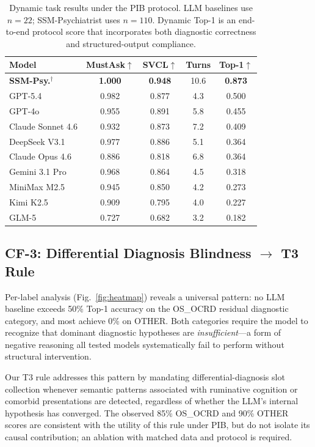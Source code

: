 \documentclass[conference]{IEEEtran}
\begin{document}
\begin{table}[htbp]
\caption{Dynamic task results under the PIB protocol. LLM baselines use $n=22$; SSM-Psychiatrist uses $n=110$. Dynamic Top-1 is an end-to-end protocol score that incorporates both diagnostic correctness and structured-output compliance.}
\label{tab:dynamic}
\begin{center}
\begin{tabular}{lcccc}
\toprule
\textbf{Model} & \textbf{MustAsk$\uparrow$} & \textbf{SVCL$\uparrow$} & \textbf{Turns} & \textbf{Top-1$\uparrow$} \\
\midrule
\rowcolor[gray]{0.88}
\textbf{SSM-Psy.}$^\dagger$ & \textbf{1.000} & \textbf{0.948} & 10.6 & \textbf{0.873} \\
\midrule
GPT-5.4           & 0.982 & 0.877 & 4.3 & 0.500 \\
GPT-4o            & 0.955 & 0.891 & 5.8 & 0.455 \\
Claude Sonnet 4.6 & 0.932 & 0.873 & 7.2 & 0.409 \\
DeepSeek V3.1     & 0.977 & 0.886 & 5.1 & 0.364 \\
Claude Opus 4.6   & 0.886 & 0.818 & 6.8 & 0.364 \\
Gemini 3.1 Pro    & 0.968 & 0.864 & 4.5 & 0.318 \\
MiniMax M2.5      & 0.945 & 0.850 & 4.2 & 0.273 \\
Kimi K2.5         & 0.909 & 0.795 & 4.0 & 0.227 \\
GLM-5             & 0.727 & 0.682 & 3.2 & 0.182 \\
\bottomrule
\end{tabular}
\end{center}
\end{table}

\subsection{CF-3: Differential Diagnosis Blindness $\rightarrow$ T3 Rule}

Per-label analysis (Fig.~\ref{fig:heatmap}) reveals a universal pattern: no LLM baseline exceeds 50\% Top-1 accuracy on the OS\_OCRD residual diagnostic category, and most achieve 0\% on OTHER. Both categories require the model to recognize that dominant diagnostic hypotheses are \textit{insufficient}---a form of negative reasoning all tested models systematically fail to perform without structural intervention.

Our T3 rule addresses this pattern by mandating differential-diagnosis slot collection whenever semantic patterns associated with ruminative cognition or comorbid presentations are detected, regardless of whether the LLM's internal hypothesis has converged. The observed 85\% OS\_OCRD and 90\% OTHER scores are consistent with the utility of this rule under PIB, but do not isolate its causal contribution; an ablation with matched data and protocol is required.
\end{document}
